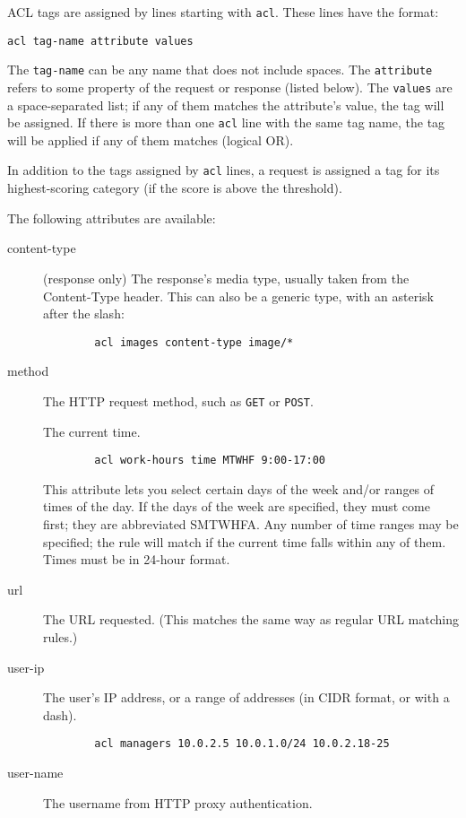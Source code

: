 \documentclass{article}
\begin{document}
ACL tags are assigned by lines starting with \verb"acl". 
These lines have the format:

\begin{verbatim}
acl tag-name attribute values
\end{verbatim}

The \verb"tag-name" can be any name that does not include spaces.
The \verb"attribute" refers to some property of the request or response (listed below).
The \verb"values" are a space-separated list; if any of them matches the attribute's value, the tag will be assigned.
If there is more than one \verb"acl" line with the same tag name, the tag will be applied if any of them matches (logical OR).

In addition to the tags assigned by \verb"acl" lines, a request is assigned a tag for its highest-scoring category
(if the score is above the threshold).

The following attributes are available:

\begin{description}

	\item[content-type] (response only) The response's media type, usually taken from the Content-Type header.
		This can also be a generic type, with an asterisk after the slash:

		\begin{verbatim}
		acl images content-type image/*
		\end{verbatim}

	\item[method] The HTTP request method, such as \verb"GET" or \verb"POST".

	\itme[time] The current time.

		\begin{verbatim}
		acl work-hours time MTWHF 9:00-17:00
		\end{verbatim}

		This attribute lets you select certain days of the week and/or ranges of times of the day.
		If the days of the week are specified, they must come first; they are abbreviated SMTWHFA.
		Any number of time ranges may be specified; the rule will match if the current time falls within any of them.
		Times must be in 24-hour format.

	\item[url] The URL requested. (This matches the same way as regular URL matching rules.)

	\item[user-ip] The user's IP address, or a range of addresses (in CIDR format, or with a dash).

		\begin{verbatim}
		acl managers 10.0.2.5 10.0.1.0/24 10.0.2.18-25
		\end{verbatim}

	\item[user-name] The username from HTTP proxy authentication.
	
\end{description}
\end{document}
